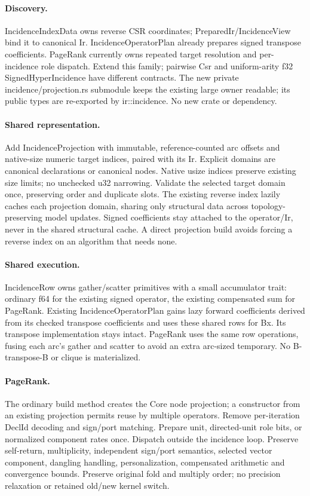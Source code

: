 \documentclass[11pt,a4paper]{article}
\begin{document}
\paragraph{Discovery.} IncidenceIndexData owns reverse CSR coordinates;
PreparedIr/IncidenceView bind it to canonical Ir. IncidenceOperatorPlan already
prepares signed transpose coefficients. PageRank currently owns repeated target
resolution and per-incidence role dispatch. Extend this family; pairwise Csr and
uniform-arity f32 SignedHyperIncidence have different contracts. The new private
incidence/projection.rs submodule keeps the existing large owner readable; its
public types are re-exported by ir::incidence. No new crate or dependency.
\paragraph{Shared representation.} Add IncidenceProjection with immutable,
reference-counted arc offsets and native-size numeric target indices, paired
with its Ir. Explicit domains are canonical declarations or canonical nodes.
Native usize indices preserve existing size limits; no unchecked u32 narrowing.
Validate the selected target domain once, preserving order and duplicate slots.
The existing reverse index lazily caches each projection domain, sharing only
structural data across topology-preserving model updates. Signed coefficients
stay attached to the operator/Ir, never in the shared structural cache. A direct
projection build avoids forcing a reverse index on an algorithm that needs none.
\paragraph{Shared execution.} IncidenceRow owns gather/scatter primitives with a
small accumulator trait: ordinary f64 for the existing signed operator, the
existing compensated sum for PageRank. Existing IncidenceOperatorPlan gains
lazy forward coefficients derived from its checked transpose coefficients and
uses these shared rows for Bx. Its transpose implementation stays intact.
PageRank uses the same row operations, fusing each arc's gather and scatter to
avoid an extra arc-sized temporary. No B-transpose-B or clique is materialized.
\paragraph{PageRank.} The ordinary build method creates the Core node projection;
a constructor from an existing projection permits reuse by multiple operators.
Remove per-iteration DeclId decoding and sign/port matching. Prepare unit,
directed-unit role bits, or normalized component rates once. Dispatch outside
the incidence loop. Preserve self-return, multiplicity, independent sign/port
semantics, selected vector component, dangling handling, personalization,
compensated arithmetic and convergence bounds. Preserve original fold and multiply
order; no precision relaxation or retained old/new kernel switch.
\end{document}
